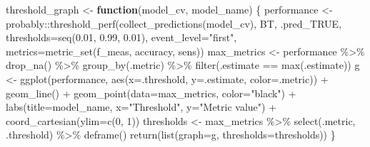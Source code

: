 \documentclass[
]{article}
\newenvironment{Shaded}{\begin{snugshade}}{\end{snugshade}}
\newcommand{\AttributeTok}[1]{\textcolor[rgb]{0.77,0.63,0.00}{#1}}
\newcommand{\ControlFlowTok}[1]{\textcolor[rgb]{0.13,0.29,0.53}{\textbf{#1}}}
\newcommand{\DecValTok}[1]{\textcolor[rgb]{0.00,0.00,0.81}{#1}}
\newcommand{\FloatTok}[1]{\textcolor[rgb]{0.00,0.00,0.81}{#1}}
\newcommand{\FunctionTok}[1]{\textcolor[rgb]{0.00,0.00,0.00}{#1}}
\newcommand{\NormalTok}[1]{#1}
\newcommand{\OtherTok}[1]{\textcolor[rgb]{0.56,0.35,0.01}{#1}}
\newcommand{\SpecialCharTok}[1]{\textcolor[rgb]{0.00,0.00,0.00}{#1}}
\newcommand{\StringTok}[1]{\textcolor[rgb]{0.31,0.60,0.02}{#1}}
\begin{document}
\begin{Shaded}
\begin{Highlighting}[]
\NormalTok{threshold\_graph }\OtherTok{\textless{}{-}} \ControlFlowTok{function}\NormalTok{(model\_cv, model\_name) \{}
\NormalTok{    performance }\OtherTok{\textless{}{-}}\NormalTok{ probably}\SpecialCharTok{::}\FunctionTok{threshold\_perf}\NormalTok{(}\FunctionTok{collect\_predictions}\NormalTok{(model\_cv), BT, .pred\_TRUE,}
        \AttributeTok{thresholds=}\FunctionTok{seq}\NormalTok{(}\FloatTok{0.01}\NormalTok{, }\FloatTok{0.99}\NormalTok{, }\FloatTok{0.01}\NormalTok{), }\AttributeTok{event\_level=}\StringTok{"first"}\NormalTok{,}
        \AttributeTok{metrics=}\FunctionTok{metric\_set}\NormalTok{(f\_meas, accuracy, sens))}
\NormalTok{    max\_metrics }\OtherTok{\textless{}{-}}\NormalTok{ performance }\SpecialCharTok{\%\textgreater{}\%}
        \FunctionTok{drop\_na}\NormalTok{() }\SpecialCharTok{\%\textgreater{}\%}
        \FunctionTok{group\_by}\NormalTok{(.metric) }\SpecialCharTok{\%\textgreater{}\%}
        \FunctionTok{filter}\NormalTok{(.estimate }\SpecialCharTok{==} \FunctionTok{max}\NormalTok{(.estimate))}
\NormalTok{    g }\OtherTok{\textless{}{-}} \FunctionTok{ggplot}\NormalTok{(performance, }\FunctionTok{aes}\NormalTok{(}\AttributeTok{x=}\NormalTok{.threshold, }\AttributeTok{y=}\NormalTok{.estimate, }\AttributeTok{color=}\NormalTok{.metric)) }\SpecialCharTok{+}
        \FunctionTok{geom\_line}\NormalTok{() }\SpecialCharTok{+}
        \FunctionTok{geom\_point}\NormalTok{(}\AttributeTok{data=}\NormalTok{max\_metrics, }\AttributeTok{color=}\StringTok{"black"}\NormalTok{) }\SpecialCharTok{+}
        \FunctionTok{labs}\NormalTok{(}\AttributeTok{title=}\NormalTok{model\_name, }\AttributeTok{x=}\StringTok{"Threshold"}\NormalTok{, }\AttributeTok{y=}\StringTok{"Metric value"}\NormalTok{) }\SpecialCharTok{+}
        \FunctionTok{coord\_cartesian}\NormalTok{(}\AttributeTok{ylim=}\FunctionTok{c}\NormalTok{(}\DecValTok{0}\NormalTok{, }\DecValTok{1}\NormalTok{))}
\NormalTok{    thresholds }\OtherTok{\textless{}{-}}\NormalTok{ max\_metrics }\SpecialCharTok{\%\textgreater{}\%}
        \FunctionTok{select}\NormalTok{(.metric, .threshold) }\SpecialCharTok{\%\textgreater{}\%}
        \FunctionTok{deframe}\NormalTok{()}
    \FunctionTok{return}\NormalTok{(}\FunctionTok{list}\NormalTok{(}\AttributeTok{graph=}\NormalTok{g, }\AttributeTok{thresholds=}\NormalTok{thresholds))}
\NormalTok{\}}


\end{Highlighting}
\end{Shaded}
\end{document}

